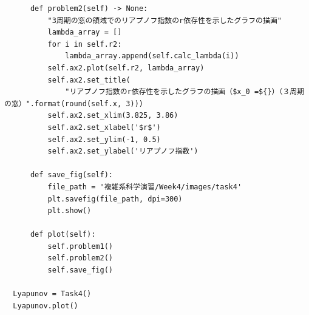 \begin{lstlisting}
      def problem2(self) -> None:
          "3周期の窓の領域でのリアプノフ指数のr依存性を示したグラフの描画"
          lambda_array = []
          for i in self.r2:
              lambda_array.append(self.calc_lambda(i))
          self.ax2.plot(self.r2, lambda_array)
          self.ax2.set_title(
              "リアプノフ指数のr依存性を示したグラフの描画（$x_0 =${}）（３周期の窓）".format(round(self.x, 3)))
          self.ax2.set_xlim(3.825, 3.86)
          self.ax2.set_xlabel('$r$')
          self.ax2.set_ylim(-1, 0.5)
          self.ax2.set_ylabel('リアプノフ指数')

      def save_fig(self):
          file_path = '複雑系科学演習/Week4/images/task4'
          plt.savefig(file_path, dpi=300)
          plt.show()

      def plot(self):
          self.problem1()
          self.problem2()
          self.save_fig()

  Lyapunov = Task4()
  Lyapunov.plot()
\end{lstlisting}